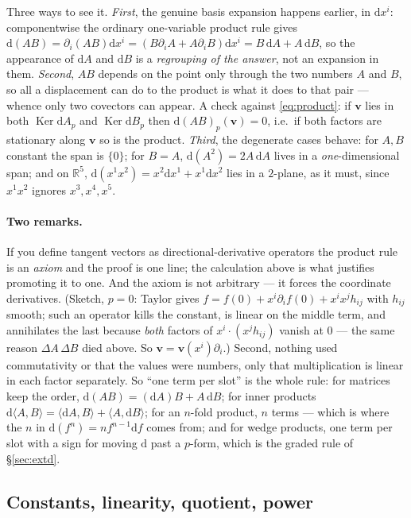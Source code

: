 \documentclass[10pt,a4paper]{article}
\newcommand{\dd}{\mathrm{d}}
\newcommand{\R}{\mathbb{R}}
\newcommand{\vv}{\mathbf{v}}
\newcommand{\pair}[2]{\langle #1 , #2 \rangle}
\newcommand{\Ker}{\operatorname{Ker}}
\theoremstyle{plain}
\theoremstyle{definition}
\numberwithin{equation}{section}
\begin{document}
Three ways to see it. \emph{First}, the
genuine basis expansion happens earlier, in $\dd x^i$: componentwise the ordinary one-variable
product rule gives
$\dd(AB)=\partial_i(AB)\dd x^i=(B\partial_iA+A\partial_iB)\dd x^i=B\,\dd A+A\,\dd B$, so the
appearance of $\dd A$ and $\dd B$ is a \emph{regrouping of the answer}, not an expansion in
them. \emph{Second}, $AB$ depends on the point only through the two numbers $A$ and $B$, so all
a displacement can do to the product is what it does to that pair --- whence only two covectors
can appear. A check against \eqref{eq:product}: if $\vv$ lies in both $\Ker\dd A_p$ and
$\Ker\dd B_p$ then $\dd(AB)_p(\vv)=0$, i.e.\ if both factors are stationary along $\vv$ so is
the product. \emph{Third}, the degenerate cases behave: for $A,B$ constant the span is $\{0\}$;
for $B=A$, $\dd(A^2)=2A\,\dd A$ lives in a \emph{one}-dimensional span; and on $\R^5$,
$\dd(x^1x^2)=x^2\dd x^1+x^1\dd x^2$ lies in a $2$-plane, as it must, since $x^1x^2$ ignores
$x^3,x^4,x^5$.

\paragraph{Two remarks.} If you define tangent vectors as directional-derivative operators the
product rule is an \emph{axiom} and the proof is one line; the calculation above is what
justifies promoting it to one. And the axiom is not arbitrary --- it forces the coordinate
derivatives. (Sketch, $p=0$: Taylor gives $f=f(0)+x^i\partial_if(0)+x^ix^jh_{ij}$ with $h_{ij}$
smooth; such an operator kills the constant, is linear on the middle term, and annihilates the
last because \emph{both} factors of $x^i\cdot(x^jh_{ij})$ vanish at $0$ --- the same reason
$\Delta A\,\Delta B$ died above. So $\vv=\vv(x^i)\partial_i$.) Second, nothing used
commutativity or that the values were numbers, only that multiplication is linear in each factor
separately. So ``one term per slot'' is the whole rule: for matrices keep the order,
$\dd(AB)=(\dd A)B+A\,\dd B$; for inner products
$\dd\pair AB=\pair{\dd A}B+\pair A{\dd B}$; for an $n$-fold product, $n$ terms --- which is where
the $n$ in $\dd(f^n)=nf^{n-1}\dd f$ comes from; and for wedge products, one term per slot with a
sign for moving $\dd$ past a $p$-form, which is the graded rule of \S\ref{sec:extd}.

\subsection{Constants, linearity, quotient, power}
\end{document}
